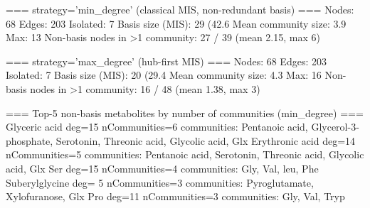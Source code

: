 === strategy='min_degree' (classical MIS, non-redundant basis) ===
Nodes: 68   Edges: 203   Isolated: 7
Basis size (MIS): 29  (42.6%
Mean community size: 3.9   Max: 13
Non-basis nodes in >1 community: 27 / 39 (mean 2.15, max 6)

=== strategy='max_degree' (hub-first MIS) ===
Nodes: 68   Edges: 203   Isolated: 7
Basis size (MIS): 20  (29.4%
Mean community size: 4.3   Max: 16
Non-basis nodes in >1 community: 16 / 48 (mean 1.38, max 3)

=== Top-5 non-basis metabolites by number of communities (min_degree) ===
  Glyceric acid           deg=15  nCommunities=6  communities: Pentanoic acid, Glycerol-3-phosphate, Serotonin, Threonic acid, Glycolic acid, Glx
  Erythronic acid         deg=14  nCommunities=5  communities: Pentanoic acid, Serotonin, Threonic acid, Glycolic acid, Glx
  Ser                     deg=15  nCommunities=4  communities: Gly, Val, leu, Phe
  Suberylglycine          deg= 5  nCommunities=3  communities: Pyroglutamate, Xylofuranose, Glx
  Pro                     deg=11  nCommunities=3  communities: Gly, Val, Tryp

